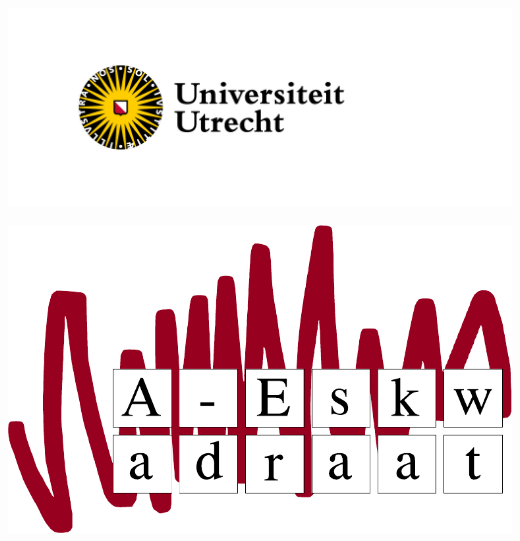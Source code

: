 \documentclass[thesis]{subfiles}
\begin{document}

\begin{titlepage} %

	\noindent
	\begin{minipage}{0.5\textwidth}
		\includegraphics[width=\linewidth]{uulogoNL} %
	\end{minipage}
	\hfill
    \begin{minipage}{0.2\textwidth}\raggedleft
		\includegraphics[width=\linewidth]{aes2logo-rood} %
	\end{minipage}
    

\end{titlepage}
\end{document}
